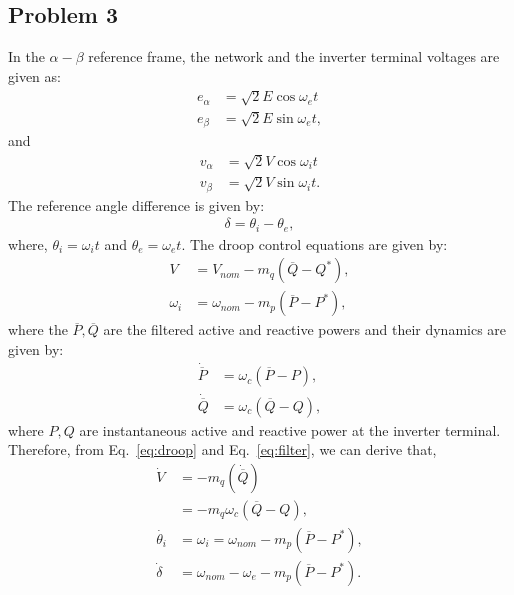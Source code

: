 \subsection*{Problem 3}
In the $\alpha-\beta$ reference frame, the network and the inverter terminal voltages are given as:
\begin{align}\label{eq:e_alpha_beta}
	e_{\alpha} &= \sqrt{2}E\cos \omega_et \nonumber\\
	e_{\beta} &= \sqrt{2}E\sin \omega_et,
\end{align}
and
\begin{align}\label{eq:v_alpha_beta}
	v_{\alpha} &= \sqrt{2}V\cos \omega_it \nonumber\\
	v_{\beta} &= \sqrt{2}V\sin \omega_it.
\end{align}
The reference angle difference is given by:
\begin{align}\label{eq:delta}
	\delta = \theta_i-\theta_e,
\end{align}
where, $\theta_i = \omega_it$ and $\theta_e = \omega_et$. The droop control equations are given by:
\begin{align}\label{eq:droop}
	V &= V_{nom} - m_q(\overline{Q}-Q^*), \nonumber\\
	\omega_i &= \omega_{nom} - m_p(\overline{P}-P^*),
\end{align}
where the $\overline{P}, \overline{Q}$ are the filtered active and reactive powers and their dynamics are given by:
\begin{align}\label{eq:filter}
	\dot{\overline{P}} &= \omega_c(\overline{P}-P), \nonumber\\
	\dot{\overline{Q}} &= \omega_c(\overline{Q}-Q),
\end{align}
where $P,Q$ are instantaneous active and reactive power at the inverter terminal. Therefore, from Eq.~\ref{eq:droop} and Eq.~\ref{eq:filter}, we can derive that,
\begin{align}\label{eq:v_dot_delta_dot}
	\dot{V} &= -m_q(\dot{\overline{Q}}) \nonumber\\
	&= -m_q\omega_c(\overline{Q}-Q), \nonumber\\
	\dot{\theta_i} &= \omega_i = \omega_{nom}-m_p(\overline{P}-P^*), \nonumber\\
	\dot{\delta} &= \omega_{nom}-\omega_e - m_p(\overline{P}-P^*).
\end{align}
